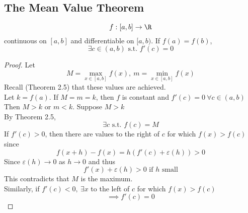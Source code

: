 \subsection{The Mean Value Theorem}
\begin{theorem}
\[f:[a,b]\to \R\]
continuous on $[a,b]$ and differentiable on $[a,b)$. If $f(a) = f(b)$,
\[\exists c\in (a,b)\text{ s.t. }f'(c)=0\]






\begin{proof}
Let \[M = \max_{x\in [a,b]} f(x), \ m = \min_{x\in [a,b]}f(x)\]
Recall (Theorem 2.5) that these values are achieved.\\
Let $k = f(a)$. If $M=m=k$, then $f$ is constant and $f'(c) = 0 \ \forall c\in (a,b)$\\
Then $M>k$ or $m<k$. Suppose $M>k$\\
By Theorem 2.5,
\[\exists c \text{ s.t. } f(c) = M\]
If $f'(c)>0$, then there are values to the right of $c$ for which $f(x) > f(c)$ since
\[f(x+h) - f(x) = h(f'(c) + \varepsilon(h))>0\]
Since $\varepsilon(h) \to 0$ as $h\to 0$ and thus
\[f'(x) + \varepsilon(h) > 0\text{ if }h\text{ small}\]
This contradicts that $M$ is the maximum.\\
Similarly, if $f'(c)<0, \ \exists x$ to the left of $c$ for which $f(x) > f(c)$
\[\implies f'(c) = 0\]
\end{proof}
\end{theorem}
